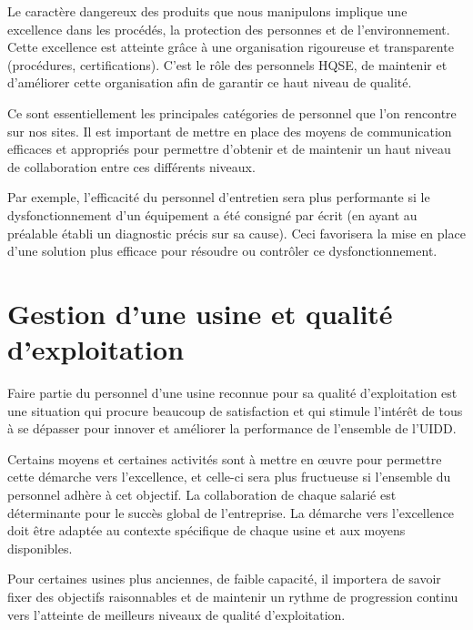 Le caractère dangereux des produits que nous manipulons implique une excellence dans les procédés, la protection des personnes et de l’environnement. Cette excellence est atteinte grâce à une organisation rigoureuse et transparente (procédures, certifications). C’est le rôle des personnels HQSE, de maintenir et d’améliorer cette organisation afin de garantir ce haut niveau de qualité.
\vspace{0.3cm} 


Ce sont essentiellement les principales catégories de personnel que l’on rencontre sur nos sites. Il est important de mettre en place des moyens de communication efficaces et appropriés pour permettre d’obtenir et de maintenir un haut niveau de collaboration entre ces différents niveaux.
\vspace{0.3cm} 

Par exemple, l’efficacité du personnel d’entretien sera plus performante si le dysfonctionnement d’un équipement a été consigné par écrit (en ayant au préalable établi un diagnostic précis sur sa cause). Ceci favorisera la mise en place d’une solution plus efficace pour résoudre ou contrôler ce dysfonctionnement.



\section{Gestion d’une usine et qualité d’exploitation}


Faire partie du personnel d’une usine reconnue pour sa qualité d’exploitation est une situation qui procure beaucoup de satisfaction et qui stimule l’intérêt de tous à se dépasser pour innover et améliorer la performance de l’ensemble de l’UIDD.
\vspace{0.3cm} 


Certains moyens et certaines activités sont à mettre en œuvre pour permettre cette démarche vers l’excellence, et celle-ci sera plus fructueuse si l’ensemble du personnel adhère à cet objectif. La collaboration de chaque salarié est déterminante pour le succès global de l’entreprise.
La démarche vers l’excellence doit être adaptée au contexte spécifique de chaque usine et aux moyens disponibles.
\vspace{0.3cm} 


Pour certaines usines plus anciennes, de faible capacité, il importera de savoir fixer des objectifs raisonnables et de maintenir un rythme de progression continu vers l’atteinte de meilleurs niveaux de qualité d’exploitation.



